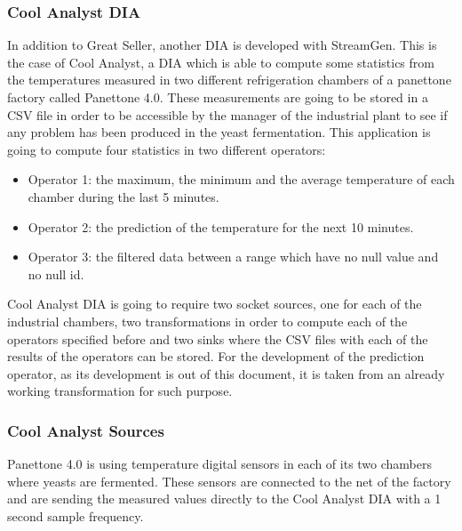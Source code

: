 \subsubsection{Cool Analyst DIA}

In addition to Great Seller, another DIA is developed with StreamGen. This is the case of Cool Analyst, a DIA which is able to compute some statistics from the temperatures measured in two different refrigeration chambers of a panettone factory called Panettone 4.0. These measurements are going to be stored in a CSV file in order to be accessible by the manager of the industrial plant to see if any problem has been produced in the yeast fermentation. This application is going to compute four statistics in two different operators:

\begin{itemize}
\item Operator 1: the maximum, the minimum and the average temperature of each chamber during the last 5 minutes.
\item Operator 2: the prediction of the temperature for the next 10 minutes.
\item Operator 3: the filtered data between a range which have no null value and no null id.
\end{itemize}

Cool Analyst DIA is going to require two socket sources, one for each of the industrial chambers, two transformations in order to compute each of the operators specified before and two sinks where the CSV files with each of the results of the operators can be stored. For the development of the prediction operator, as its development is out of this document, it is taken from an already working transformation for such purpose.

\subsubsection*{Cool Analyst Sources}

Panettone 4.0 is using temperature digital sensors in each of its two chambers where yeasts are fermented. These sensors are connected to the net of the factory and are sending the measured values directly to the Cool Analyst DIA with a 1 second sample frequency.


